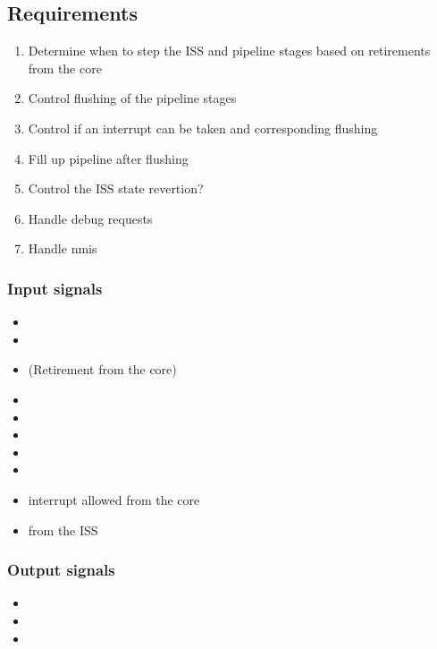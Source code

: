 \subsection{Requirements}

\begin{enumerate}
    \item Determine when to step the ISS and pipeline stages based on retirements from the core
    \item Control flushing of the pipeline stages
    \item Control if an interrupt can be taken and corresponding flushing
    \item Fill up pipeline after flushing
    \item Control the ISS state revertion?
    \item Handle debug requests
    \item Handle \acrshort{nmi}s
\end{enumerate}

\subsubsection{Input signals}
\begin{itemize}
    \item {}
    \item {}
    \item {} (Retirement from the core)
    \item {} 
    \item {}
    \item {}
    \item {} 
    \item {}
    \item {} interrupt allowed from the core
    \item {} from the ISS
\end{itemize}

\subsubsection{Output signals}
\begin{itemize}
    \item {}
    \item {}
    \item {}
\end{itemize}


